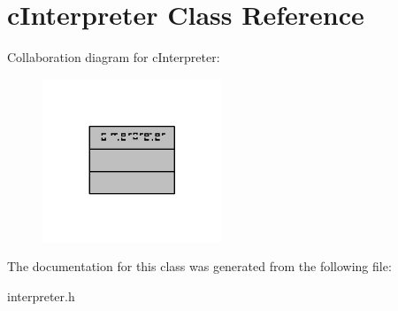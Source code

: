 \hypertarget{classcInterpreter}{\section{c\-Interpreter Class Reference}
\label{classcInterpreter}
}


Collaboration diagram for c\-Interpreter\-:
\nopagebreak
\begin{figure}[H]
\begin{center}
\leavevmode
\includegraphics[width=152pt]{classcInterpreter__coll__graph}
\end{center}
\end{figure}


The documentation for this class was generated from the following file\-:\begin{DoxyCompactItemize}
\item 
interpreter.\-h\end{DoxyCompactItemize}
